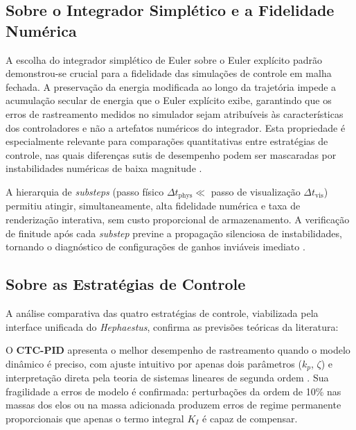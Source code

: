 \subsection{Sobre o Integrador Simplético e a Fidelidade Numérica}

A escolha do integrador simplético de Euler \cite{leimkuhler2004simulating, hairer2006geometric} sobre o Euler explícito padrão demonstrou-se crucial para a fidelidade das simulações de controle em malha fechada. A preservação da energia modificada ao longo da trajetória impede a acumulação secular de energia que o Euler explícito exibe, garantindo que os erros de rastreamento medidos no simulador sejam atribuíveis às características dos controladores e não a artefatos numéricos do integrador. Esta propriedade é especialmente relevante para comparações quantitativas entre estratégias de controle, nas quais diferenças sutis de desempenho podem ser mascaradas por instabilidades numéricas de baixa magnitude \cite{hairer2006geometric, spong2020robot}.

A hierarquia de \textit{substeps} (passo físico $\Delta t_{\text{phys}} \ll$ passo de visualização $\Delta t_{\text{vis}}$) permitiu atingir, simultaneamente, alta fidelidade numérica e taxa de renderização interativa, sem custo proporcional de armazenamento. A verificação de finitude após cada \textit{substep} previne a propagação silenciosa de instabilidades, tornando o diagnóstico de configurações de ganhos inviáveis imediato \cite{astrom1995theory}.

\subsection{Sobre as Estratégias de Controle}

A análise comparativa das quatro estratégias de controle, viabilizada pela interface unificada do \textit{Hephaestus}, confirma as previsões teóricas da literatura:

O \textbf{CTC-PID} \cite{craig1989introduction, spong2020robot} apresenta o melhor desempenho de rastreamento quando o modelo dinâmico é preciso, com ajuste intuitivo por apenas dois parâmetros ($k_p$, $\zeta$) e interpretação direta pela teoria de sistemas lineares de segunda ordem \cite{ogata2010modern, astrom1995theory}. Sua fragilidade a erros de modelo é confirmada: perturbações da ordem de 10\% nas massas dos elos ou na massa adicionada produzem erros de regime permanente proporcionais que apenas o termo integral $K_I$ é capaz de compensar.

